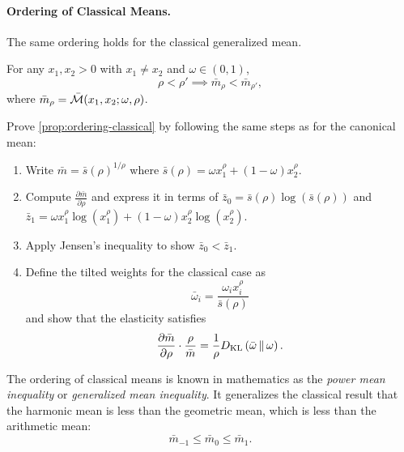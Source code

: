 \paragraph{Ordering of Classical Means.}

The same ordering holds for the classical generalized mean.

\begin{proposition}
\label{prop:ordering-classical}
For any $x_1, x_2 > 0$ with $x_1 \neq x_2$ and $\omega \in (0,1)$,
\begin{equation}
\rho < \rho' \implies \bar{m}_\rho < \bar{m}_{\rho'},
\end{equation}
where $\bar{m}_\rho = \bar{\mathcal{M}}(x_1, x_2; \omega, \rho)$.
\end{proposition}

\begin{callouttip}[Exercise]
Prove \cref{prop:ordering-classical} by following the same steps as for the canonical mean:
\begin{enumerate}[leftmargin=1.5em, label=(\alph*)]
    \item Write $\bar{m} = \bar{s}(\rho)^{1/\rho}$ where $\bar{s}(\rho) = \omega x_1^\rho + (1-\omega) x_2^\rho$.
    \item Compute $\frac{\partial \bar{m}}{\partial \rho}$ and express it in terms of $\bar{z}_0 = \bar{s}(\rho) \log(\bar{s}(\rho))$ and $\bar{z}_1 = \omega x_1^\rho \log(x_1^\rho) + (1-\omega) x_2^\rho \log(x_2^\rho)$.
    \item Apply Jensen's inequality to show $\bar{z}_0 < \bar{z}_1$.
    \item Define the tilted weights for the classical case as
    \begin{equation}
    \bar{\omega}_i = \frac{\omega_i x_i^\rho}{\bar{s}(\rho)}
    \end{equation}
    and show that the elasticity satisfies
    \begin{equation}
    \frac{\partial \bar{m}}{\partial \rho} \cdot \frac{\rho}{\bar{m}} = \frac{1}{\rho} D_{\mathrm{KL}}\left(\bar{\omega} \,\|\, \omega\right).
    \end{equation}
\end{enumerate}
\end{callouttip}

\begin{calloutnote}
The ordering of classical means is known in mathematics as the \emph{power mean inequality} or \emph{generalized mean inequality}. It generalizes the classical result that the harmonic mean is less than the geometric mean, which is less than the arithmetic mean:
\begin{equation}
\bar{m}_{-1} \leq \bar{m}_0 \leq \bar{m}_1.
\end{equation}
\end{calloutnote}


